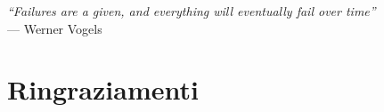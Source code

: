 
{}
{}

\begin{flushright}{
	\slshape    
	``Failures are a given, and everything will eventually fail over time''} \\ 
	\medskip
    --- Werner Vogels
\end{flushright}


\bigskip

\begingroup
\let\clearpage\relax
\let\cleardoublepage\relax
\let\cleardoublepage\relax

\chapter*{Ringraziamenti}


\endgroup

